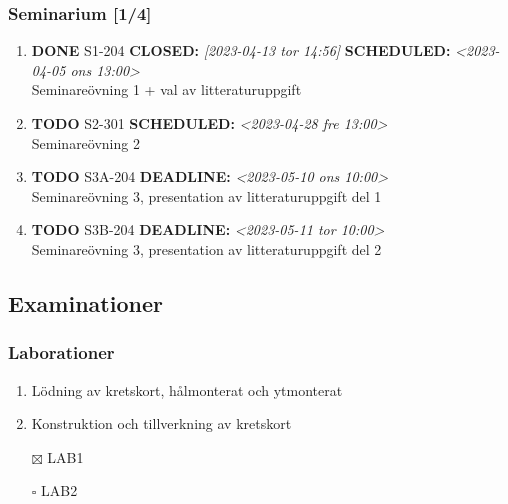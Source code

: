 \documentclass[11pt]{article}
\begin{document}
\subsubsection{Seminarium [1/4]}
\label{sec:org1ce32ba}
\begin{enumerate}
\item {\bfseries\sffamily DONE} S1-204
\label{sec:org8ca8656}
\noindent\textbf{CLOSED:} \textit{[2023-04-13 tor 14:56] } \textbf{SCHEDULED:} \textit{<2023-04-05 ons 13:00>}\\[0pt]
Seminareövning 1 + val av litteraturuppgift

\item {\bfseries\sffamily TODO} S2-301
\label{sec:orgf6dfba1}
\noindent\textbf{SCHEDULED:} \textit{<2023-04-28 fre 13:00>}\\[0pt]
Seminareövning 2

\item {\bfseries\sffamily TODO} S3A-204
\label{sec:orgeab260f}
\noindent\textbf{DEADLINE:} \textit{<2023-05-10 ons 10:00>}\\[0pt]
Seminareövning 3, presentation av litteraturuppgift del 1

\item {\bfseries\sffamily TODO} S3B-204
\label{sec:orgfd697e3}
\noindent\textbf{DEADLINE:} \textit{<2023-05-11 tor 10:00>}\\[0pt]
Seminareövning 3, presentation av litteraturuppgift del 2
\end{enumerate}


\subsection{Examinationer}
\label{sec:org4b90555}
\subsubsection{Laborationer}
\label{sec:org2fdcbfb}
\begin{enumerate}
\item Lödning av kretskort, hålmonterat och ytmonterat
\item Konstruktion och tillverkning av kretskort
\end{enumerate}


\begin{itemize}
\item[{$\boxtimes$}] LAB1
\item[{$\square$}] LAB2
\end{itemize}
\end{document}
